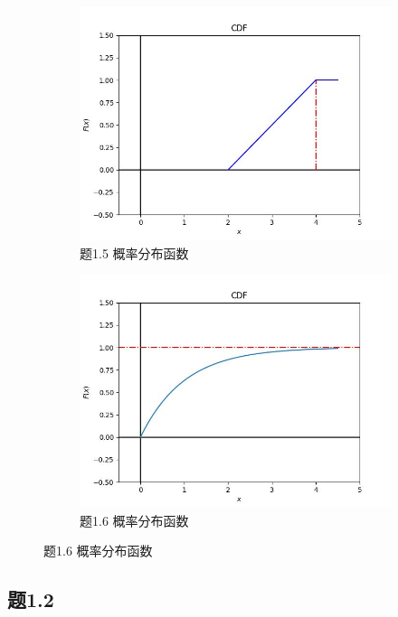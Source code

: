 \documentclass{article}
\begin{document}
\begin{figure}[!ht]
\begin{subfigure}[b]{0.4\textwidth}
			\includegraphics[width=\textwidth]{figure/1-5-CDF}
			\caption{题1.5 概率分布函数}
			\label{fig:1-5-CDF}
		\end{subfigure}
		\begin{subfigure}[b]{0.4\textwidth}
			\includegraphics[width=\textwidth]{figure/1-6-CDF}
			\caption{题1.6 概率分布函数}
			\label{fig:1-6-CDF}
		\end{subfigure}		
	\end{figure}


	\subsection*{题1.2}
	\quad 
	
\end{document}
